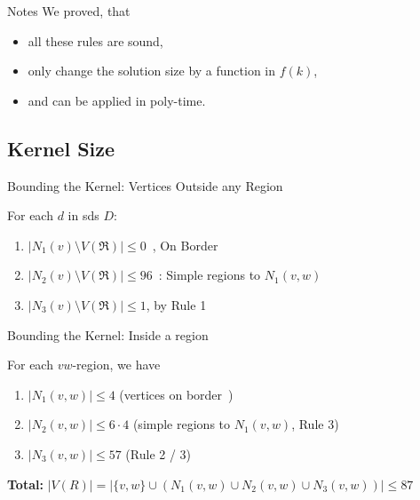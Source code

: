 \begin{frame}[c]{Notes}
    We proved, that
    \begin{itemize}
        \pause \item all these rules are sound,
        \pause \item only change the solution size by a function in $f(k)$, 
        \pause \item and can be applied in poly-time.
    \end{itemize}
\end{frame}

\subsection{Kernel Size}
\begin{frame}[c]{Bounding the Kernel: Vertices Outside any Region}   
    \begin{figure}[!ht]
    \end{figure}

    \pause For each $d$ in sds $D$:
    \begin{enumerate}
           \pause \item $|N_1(v) \setminus V(\mathfrak{R})| \leq 0$~\cite{Alber2004}, On Border
           \pause \item $|N_2(v) \setminus V(\mathfrak{R})| \leq 96$~\cite{Alber2004}: Simple regions to $N_1(v,w)$  
           \pause \item $|N_3(v) \setminus V(\mathfrak{R})| \leq 1$, by Rule 1
        \end{enumerate}
\end{frame}
\begin{frame}[c]{Bounding the Kernel: Inside a region}

    \begin{figure}[!ht]
    \end{figure}
    For each $vw$-region, we have
    \begin{enumerate}
\pause        \item $|N_1(v,w)| \leq 4$ (vertices on border~\cite{Alber2004})
\pause        \item $|N_2(v,w)| \leq 6 \cdot 4$ (simple regions to $N_1(v,w)$, Rule 3)
\pause        \item $|N_3(v,w)| \leq 57$ (Rule 2 / 3)
    \end{enumerate}

    \textbf{Total: } $|V(R)| = |\{v, w\} \cup (N_1(v,w) \cup N_2(v, w) \cup N_3(v, w))| \leq 87$
\end{frame}
